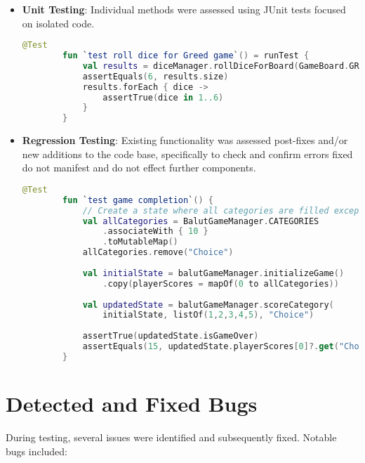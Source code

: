 \begin{itemize}
    \item \textbf{Unit Testing}: Individual methods were assessed using JUnit tests focused on isolated code.
    \begin{lstlisting}[language=Kotlin, caption=Unit Test for Dice Rolling, label=lst:unit_dice_rolling]
        @Test
        fun `test roll dice for Greed game`() = runTest {
            val results = diceManager.rollDiceForBoard(GameBoard.GREED.modeName)
            assertEquals(6, results.size)
            results.forEach { dice ->
                assertTrue(dice in 1..6)
            }
        }
    \end{lstlisting}
    \item \textbf{Regression Testing}: Existing functionality was assessed post-fixes and/or new additions to the code base, specifically to check and confirm errors fixed do not manifest and do not effect further components.
    \begin{lstlisting}[language=Kotlin, caption=Regression Test for Game Completion, label=lst:regression_game_completion]
        @Test
        fun `test game completion`() {
            // Create a state where all categories are filled except one
            val allCategories = BalutGameManager.CATEGORIES
                .associateWith { 10 }
                .toMutableMap()
            allCategories.remove("Choice")
            
            val initialState = balutGameManager.initializeGame()
                .copy(playerScores = mapOf(0 to allCategories))
            
            val updatedState = balutGameManager.scoreCategory(
                initialState, listOf(1,2,3,4,5), "Choice")
            
            assertTrue(updatedState.isGameOver)
            assertEquals(15, updatedState.playerScores[0]?.get("Choice"))
        }
    \end{lstlisting}
\end{itemize}

\section{Detected and Fixed Bugs}

During testing, several issues were identified and subsequently fixed.  Notable bugs included:

